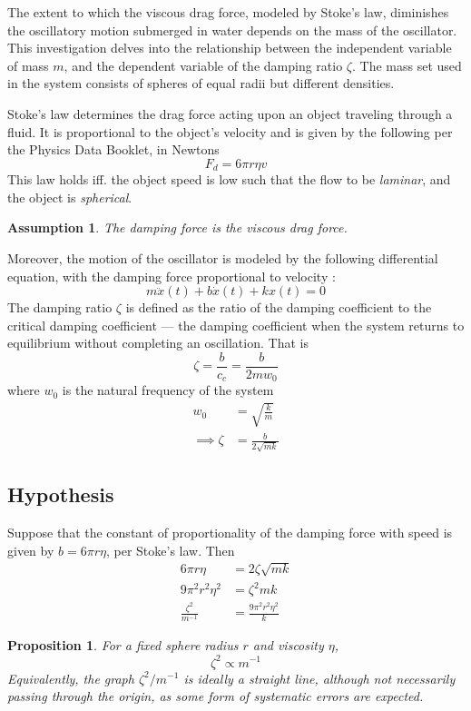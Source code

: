 \documentclass[a4paper,12pt]{article}
\newtheorem{proposition}{Proposition}
\newtheorem{assumption}{Assumption}
\begin{document}
The extent to which the viscous drag force, modeled by Stoke's law, diminishes the oscillatory motion submerged in water depends on the mass of the oscillator. This investigation delves into the relationship between the independent variable of mass $m$, and the dependent variable of the damping ratio $\zeta$. The mass set used in the system consists of spheres of equal radii but different densities.

Stoke's law determines the drag force acting upon an object traveling through a fluid. It is proportional to the object's velocity and is given by the following per the Physics Data Booklet, in Newtons
$$F_d = 6\pi r \eta v $$
This law holds iff. the object speed is low such that the flow to be \textit{laminar}, and the object is \textit{spherical}.

\begin{assumption}
  \label{as:1}
  The damping force is the viscous drag force.
\end{assumption}

Moreover, the motion of the oscillator is modeled by the following differential equation, with the damping force proportional to velocity \parencite{miller_2004_13}:
\begin{equation}
  \label{eq:1}
  m\ddot{x}(t) + b\dot{x}(t) + kx(t) = 0
\end{equation}
The damping ratio $\zeta$ is defined as the ratio of the damping coefficient to the critical damping coefficient --- the damping coefficient when the system returns to equilibrium without completing an oscillation. That is $$\zeta = \frac{b}{c_c} = \frac{b}{2mw_0}$$
where $w_0$ is the natural frequency of the system
\begin{align*}
  w_0            & = \sqrt{\frac{k}{m}}   \\
  \implies \zeta & = \frac{b}{2\sqrt{mk}}
\end{align*}

\subsection{Hypothesis}

Suppose that the constant of proportionality of the damping force with speed is given by $b = 6\pi r \eta$, per Stoke's law. Then
\begin{align*}
  6\pi r \eta            & = 2\zeta \sqrt{mk}            \\
  9\pi^2 r^2 \eta^2      & = \zeta^2mk                   \\
  \frac{\zeta^2}{m^{-1}} & = \frac{9\pi^2 r^2 \eta^2}{k}
\end{align*}
\begin{proposition}
  \label{prop:1}
  For a fixed sphere radius $r$ and viscosity $\eta$, \begin{equation}\label{eq:2}
    \zeta^2 \propto m^{-1}
  \end{equation}
  Equivalently, the graph $\zeta^2/m^{-1}$ is ideally a straight line, although not necessarily passing through the origin, as some form of systematic errors are expected.
\end{proposition}
\end{document}
